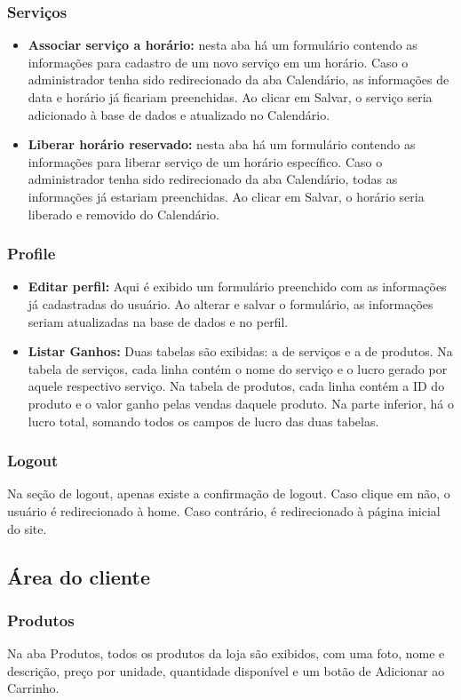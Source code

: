 \documentclass[10pt,a4paper]{article}
\begin{document}
\subsubsection{Serviços}
\begin{itemize}
\item \textbf{Associar serviço a horário:} nesta aba há um formulário contendo as informações para cadastro de um novo serviço em um horário. Caso o administrador tenha sido redirecionado da aba Calendário, as informações de data e horário já ficariam preenchidas. Ao clicar em Salvar, o serviço seria adicionado à base de dados e atualizado no Calendário.
\item \textbf{Liberar horário reservado: } nesta aba há um formulário contendo as informações para liberar serviço de um horário específico. Caso o administrador tenha sido redirecionado da aba Calendário, todas as informações já estariam preenchidas. Ao clicar em Salvar, o horário seria liberado e removido do Calendário.
\end{itemize}
\subsubsection{Profile}
\begin{itemize}
\item \textbf{Editar perfil:} Aqui é exibido um formulário preenchido com as informações já cadastradas do usuário. Ao alterar e salvar o formulário, as informações seriam atualizadas na base de dados e no perfil.
\item \textbf{Listar Ganhos:} Duas tabelas são exibidas: a de serviços e a de produtos. Na tabela de serviços, cada linha contém o nome do serviço e o lucro gerado por aquele respectivo serviço. Na tabela de produtos, cada linha contém a ID do produto e o valor ganho pelas vendas daquele produto. Na parte inferior, há o lucro total, somando todos os campos de lucro das duas tabelas.
\end{itemize}
\subsubsection{Logout}
Na seção de logout, apenas existe a confirmação de logout. Caso clique em não, o usuário é redirecionado à home. Caso contrário, é redirecionado à página inicial do site.
\newpage
\subsection{Área do cliente}
\subsubsection{Produtos}
Na aba Produtos, todos os produtos da loja são exibidos, com uma foto, nome e descrição, preço por unidade, quantidade disponível e um botão de Adicionar ao Carrinho.
\end{document}
